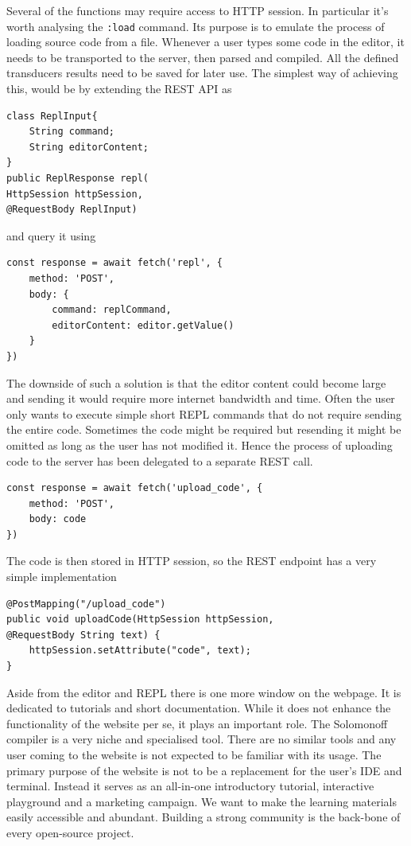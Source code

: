 Several of the functions may require access to HTTP session. In particular it's worth analysing the     \texttt{:load} command. Its purpose is to emulate the process of loading source code from a file. Whenever a user types some code in the editor, it needs to be transported to the server, then parsed and compiled. All the defined transducers results need to be saved for later use. The simplest way of achieving this, would be by extending the REST API as
\begin{lstlisting}
class ReplInput{
    String command;
    String editorContent;
}
public ReplResponse repl(
HttpSession httpSession, 
@RequestBody ReplInput)
\end{lstlisting}
and query it using
\begin{lstlisting}
const response = await fetch('repl', {
    method: 'POST',
    body: {
        command: replCommand,
        editorContent: editor.getValue()
    }
})
\end{lstlisting}
The downside of such a solution is that the editor content could become large and sending it would require more internet bandwidth and time. Often the user only wants to execute simple short REPL commands that do not require sending the entire code. Sometimes the code might be required but resending it might be omitted as long as the user has not modified it. Hence the process of uploading code to the server has been delegated to a separate REST call.
\begin{lstlisting}
const response = await fetch('upload_code', {
    method: 'POST',
    body: code
})
\end{lstlisting}
The code is then stored in HTTP session, so the REST endpoint has a very simple implementation
\begin{lstlisting}
@PostMapping("/upload_code")
public void uploadCode(HttpSession httpSession, 
@RequestBody String text) {
    httpSession.setAttribute("code", text);
}
\end{lstlisting}


Aside from the editor and REPL there is one more window on the webpage. It is dedicated to tutorials and short documentation.  While it does not enhance the functionality of the website per se, it plays an important role. The Solomonoff compiler is a very niche and specialised tool. There are no similar tools and any user coming to the website is not expected to be familiar with its usage. The primary purpose of the website is not to be a replacement for the user's IDE and terminal. Instead it serves as an all-in-one introductory tutorial, interactive playground and a marketing campaign. We want to make the learning materials easily accessible and abundant. Building a strong community is the back-bone of every open-source project. 

